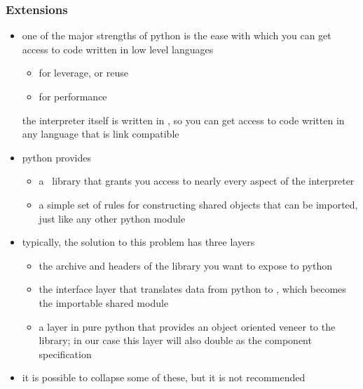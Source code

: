 %
%


\begin{frame}[fragile]
%
  \frametitle{Extensions}
%
  \begin{itemize}
  \item one of the major strengths of python is the ease with which you can get access to code
    written in low level languages
    \begin{itemize}
    \item for leverage, or reuse
    \item for performance
    \end{itemize}
    the interpreter itself is written in \cc, so you can get access to code written in any
    language that is link compatible
%
  \item python provides
    \begin{itemize}
    \item a \cc\ library that grants you access to nearly every aspect of the interpreter
    \item a simple set of rules for constructing shared objects that can be imported, just like
      any other python module
    \end{itemize}
%
  \item typically, the solution to this problem has three layers
    \begin{itemize}
    \item the archive and headers of the library you want to expose to python
    \item the interface layer that translates data from python to \cc, which becomes the
      importable shared module
    \item a layer in pure python that provides an object oriented veneer to the library; in
      our case this layer will also double as the component specification
    \end{itemize}
%
  \item it is possible to collapse some of these, but it is not recommended
%
  \end{itemize}
%
\end{frame}

